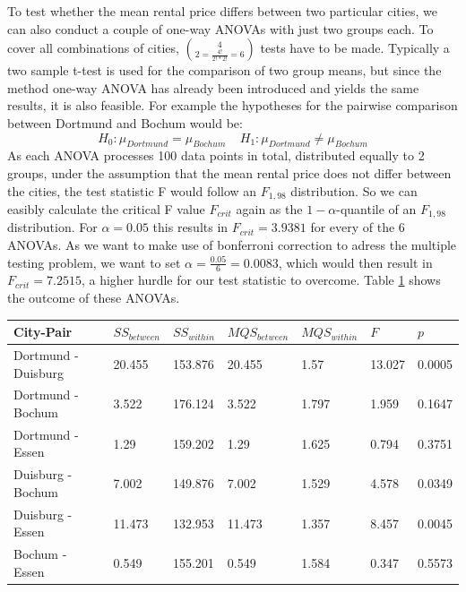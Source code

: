 \documentclass[12 pt]{scrartcl}
\begin{document}
To test whether the mean rental price differs between two particular cities, we can also conduct a couple of one-way ANOVAs with just two groups each. To cover all combinations of cities, $ 4\choose2 = \frac{4!}{2! * 2!} = 6 $ tests have to be made. Typically a two sample t-test is used for the comparison of two group means, but since the method one-way ANOVA has already been introduced and yields the same results, it is also feasible. For example the hypotheses for the pairwise comparison between Dortmund and Bochum would be:
\[ H_0: \mu_{Dortmund} = \mu_{Bochum} \ \ \ \ \ H_1: \mu_{Dortmund} \neq \mu_{Bochum}  \]
As each ANOVA processes 100 data points in total, distributed equally to 2 groups, under the assumption that the mean rental price does not differ between the cities, the test statistic F would follow an $F_{1,98}$ distribution. So we can easibly calculate the critical F value $F_{crit}$ again as the $1-\alpha$-quantile of an $F_{1,98}$ distribution. For $\alpha = 0.05$ this results in $F_{crit} = 3.9381$ for every of the 6 ANOVAs. As we want to make use of bonferroni correction to adress the multiple testing problem, we want to set $\alpha = \frac{0.05}{6} = 0.0083$, which would then result in $F_{crit} = 7.2515$, a higher hurdle for our test statistic to overcome.
Table \ref{tab:anova2} shows the outcome of these ANOVAs.

\begin{table}[ht]
  \centering
  \label{tab:anova2}
  \begin{tabular}{l|llllll}
    City-Pair           & $SS_{between}$ & $SS_{within}$ & $MQS_{between}$ & $MQS_{within}$ & $F$    & $p$    \\
    \hline
    Dortmund - Duisburg & 20.455         & 153.876       & 20.455          & 1.57           & 13.027 & 0.0005 \\
    Dortmund - Bochum   & 3.522          & 176.124       & 3.522           & 1.797          & 1.959  & 0.1647 \\
    Dortmund - Essen    & 1.29           & 159.202       & 1.29            & 1.625          & 0.794  & 0.3751 \\
    Duisburg - Bochum   & 7.002          & 149.876       & 7.002           & 1.529          & 4.578  & 0.0349 \\
    Duisburg - Essen    & 11.473         & 132.953       & 11.473          & 1.357          & 8.457  & 0.0045 \\
    Bochum - Essen      & 0.549          & 155.201       & 0.549           & 1.584          & 0.347  & 0.5573 \\
  \end{tabular}
\end{table}
\end{document}
